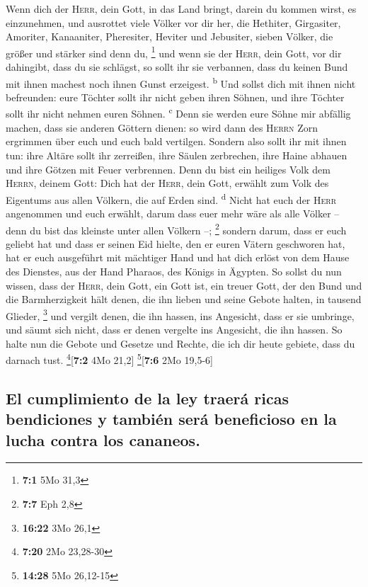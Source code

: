  Wenn dich der \textsc{Herr}, dein Gott, in das Land
bringt, darein du kommen wirst, es einzunehmen, und ausrottet viele
Völker vor dir her, die Hethiter, Girgasiter, Amoriter, Kanaaniter,
Pheresiter, Heviter und Jebusiter, sieben Völker, die größer und stärker
sind denn du, \footnote{\textbf{7:1} 5Mo 31,3}  und wenn
sie der \textsc{Herr}, dein Gott, vor dir dahingibt, dass du sie
schlägst, so sollt ihr sie verbannen, dass du keinen Bund mit ihnen
machest noch ihnen Gunst erzeigest. \textsuperscript{b} 
Und sollst dich mit ihnen nicht befreunden: eure Töchter sollt ihr nicht
geben ihren Söhnen, und ihre Töchter sollt ihr nicht nehmen euren
Söhnen. \textsuperscript{c}  Denn sie werden eure Söhne
mir abfällig machen, dass sie anderen Göttern dienen: so wird dann des
\textsc{Herrn} Zorn ergrimmen über euch und euch bald vertilgen.
 Sondern also sollt ihr mit ihnen tun: ihre Altäre sollt
ihr zerreißen, ihre Säulen zerbrechen, ihre Haine abhauen und ihre
Götzen mit Feuer verbrennen.  Denn du bist ein heiliges
Volk dem \textsc{Herrn}, deinem Gott: Dich hat der \textsc{Herr}, dein
Gott, erwählt zum Volk des Eigentums aus allen Völkern, die auf Erden
sind. \textsuperscript{d}  Nicht hat euch der
\textsc{Herr} angenommen und euch erwählt, darum dass euer mehr wäre als
alle Völker -- denn du bist das kleinste unter allen Völkern --;
\footnote{\textbf{7:7} Eph 2,8}  sondern darum, dass er
euch geliebt hat und dass er seinen Eid hielte, den er euren Vätern
geschworen hat, hat er euch ausgeführt mit mächtiger Hand und hat dich
erlöst von dem Hause des Dienstes, aus der Hand Pharaos, des Königs in
Ägypten.  So sollst du nun wissen, dass der \textsc{Herr},
dein Gott, ein Gott ist, ein treuer Gott, der den Bund und die
Barmherzigkeit hält denen, die ihn lieben und seine Gebote halten, in
tausend Glieder, \footnote{\textbf{16:22} 3Mo 26,1}  und
vergilt denen, die ihn hassen, ins Angesicht, dass er sie umbringe, und
säumt sich nicht, dass er denen vergelte ins Angesicht, die ihn hassen.
 So halte nun die Gebote und Gesetze und Rechte, die ich
dir heute gebiete, dass du darnach tust. \footnote{\textbf{7:20} 2Mo
  23,28-30}{[}\textbf{7:2} 4Mo 21,2{]} \footnote{\textbf{14:28} 5Mo
  26,12-15}{[}\textbf{7:6} 2Mo 19,5-6{]}

\hypertarget{el-cumplimiento-de-la-ley-traeruxe1-ricas-bendiciones-y-tambiuxe9n-seruxe1-beneficioso-en-la-lucha-contra-los-cananeos.}{%
\subsection{El cumplimiento de la ley traerá ricas bendiciones y también
será beneficioso en la lucha contra los
cananeos.}\label{el-cumplimiento-de-la-ley-traeruxe1-ricas-bendiciones-y-tambiuxe9n-seruxe1-beneficioso-en-la-lucha-contra-los-cananeos.}}

